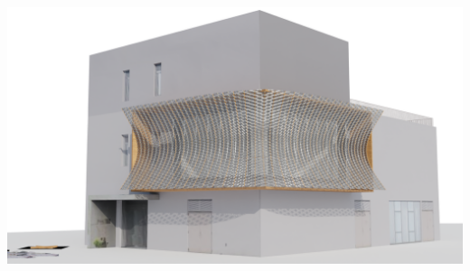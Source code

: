 \begin{table}[htb]
\begin{tabularx}
              {\includegraphics[width=1\linewidth]{Images/Pattern 3/0005}} \\
            \bottomrule
        \end{tabularx}
    \end{table}

